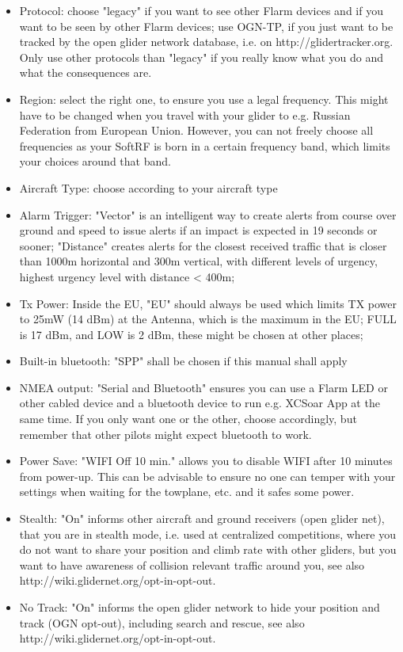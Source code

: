 \documentclass[11pt,a4paper]{article}
\begin{document}
\begin{itemize}
\item Protocol: choose "legacy" if you want to see other Flarm devices and if you want to be seen by other Flarm devices; use OGN-TP, if you just want to be tracked by the open glider network database, i.e. on http://glidertracker.org. Only use other protocols than "legacy" if you really know what you do and what the consequences are.
\item Region: select the right one, to ensure you use a legal frequency. This might have to be changed when you travel with your glider to e.g. Russian Federation from European Union. However, you can not freely choose all frequencies as your SoftRF is born in a certain frequency band, which limits your choices around that band.
\item Aircraft Type: choose according to your aircraft type
\item Alarm Trigger: "Vector" is an intelligent way to create alerts from course over ground and speed to issue alerts if an impact is expected in 19 seconds or sooner; "Distance" creates alerts for the closest received traffic that is closer than 1000m horizontal and 300m vertical, with different levels of urgency, highest urgency level with distance < 400m;
\item Tx Power: Inside the EU, "EU" should always be used which limits TX power to 25mW (14 dBm) at the Antenna, which is the maximum in the EU; FULL is 17 dBm, and LOW is 2 dBm, these might be chosen at other places;
\item Built-in bluetooth: "SPP" shall be chosen if this manual shall apply
\item NMEA output: "Serial and Bluetooth" ensures you can use a Flarm LED or other cabled device and a bluetooth device to run e.g. XCSoar App at the same time. If you only want one or the other, choose accordingly, but remember that other pilots might expect bluetooth to work.
\item Power Save: "WIFI Off 10 min." allows you to disable WIFI after 10 minutes from power-up. This can be advisable to ensure no one can temper with your settings when waiting for the towplane, etc. and it safes some power.
\item Stealth: "On" informs other aircraft and ground receivers (open glider net), that you are in stealth mode, i.e. used at centralized competitions, where you do not want to share your position and climb rate with other gliders, but you want to have awareness of collision relevant traffic around you, see also http://wiki.glidernet.org/opt-in-opt-out.
\item No Track: "On" informs the open glider network to hide your position and track (OGN opt-out), including search and rescue, see also http://wiki.glidernet.org/opt-in-opt-out.
\end{itemize}
\end{document}
